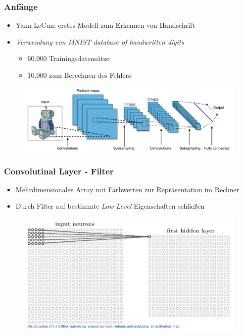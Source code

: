 \begin{frame}
\frametitle{Anfänge}

\begin{itemize}
\item Yann LeCun: erstes Modell zum Erkennen von Handschrift
\item \emph{Verwendung von MNIST database of handwritten digits}
\begin{itemize}
	\item 60.000 Trainingsdatensätze
	\item 10.000 zum Berechnen des Fehlers
\end{itemize}
\end{itemize}

\begin{figure}
	\includegraphics[width=.9\linewidth]{./geschichtliches/convolutionalNN/img/cnn_overview_alpha}
\end{figure}



\end{frame}


\begin{frame}
\frametitle{Convolutinal Layer - Filter}

\begin{itemize}
\item Mehrdimensionales Array mit Farbwerten zur Repräsentation im Rechner
\item Durch Filter auf bestimmte \emph{Low-Level} Eigenschaften schließen
\end{itemize}

\begin{figure}
	\includegraphics[width=.8\linewidth]{./geschichtliches/convolutionalNN/img/cnn_convLayer_alpha}
\end{figure}

\end{frame}


